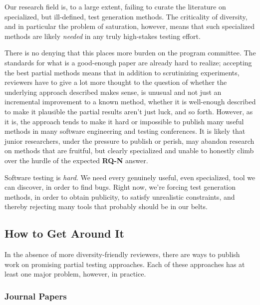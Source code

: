 \documentclass[sigplan,review]{acmart}
\begin{document}
Our research field is, to a large extent, failing to curate the
literature on specialized, but ill-defined, test generation methods.
The criticality of diversity, and in particular the problem of
saturation, however, means that such specialized methods are likely
\emph{needed} in any truly high-stakes testing effort.

There is no denying that this places more burden on the program
committee.  The standards for what is a good-enough paper are already
hard to realize; accepting the best partial methods means that in
addition to scrutinizing experiments, reviewers have to give a lot
more thought to the question of whether the underlying approach
described makes sense, is unusual and not just an incremental
improvement to a known method, whether it is well-enough described to
make it plausible the partial results aren't just luck, and so forth.
However, as it is, the approach tends to make it hard or impossible to
publish many useful methods in many software engineering and testing
conferences.  It is likely that junior researchers, under the pressure
to publish or perish, may abandon research on methods that are fruitful, but
clearly specialized and unable to honestly climb over the hurdle of
the expected {\bf RQ-N} answer.

Software testing is \emph{hard}.  We need every genuinely useful, even
specialized, tool we can discover, in order to find bugs.  Right now,
we're forcing test generation methods, in order to obtain publicity,
to satisfy unrealistic constraints, and thereby rejecting many tools
that probably should be in our belts.

\subsection{How to Get Around It}

In the absence of more diversity-friendly reviewers, there are ways to
publish work on promising partial testing approaches.  Each of these
approaches has at least one major problem, however, in practice.

\subsubsection{Journal Papers}
\end{document}
